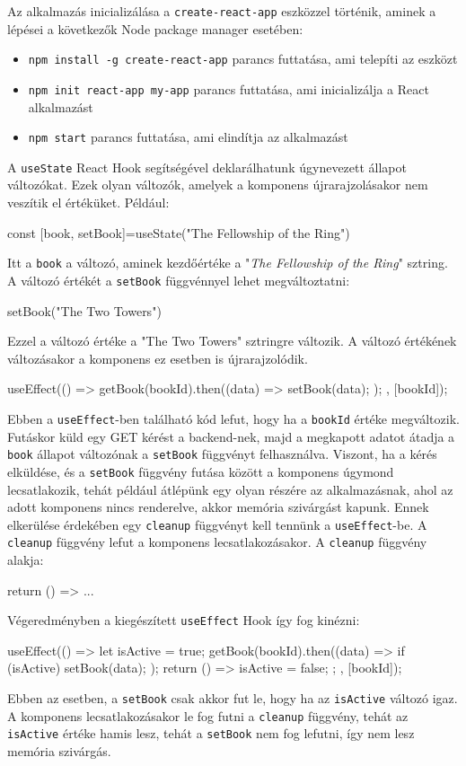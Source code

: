 Az alkalmazás inicializálása a \texttt{create-react-app} eszközzel történik, aminek a lépései a következők Node package manager esetében:
\begin{itemize}
    \item \texttt{npm install -g create-react-app} parancs futtatása, ami telepíti az eszközt
    \item \texttt{npm init react-app my-app} parancs futtatása, ami inicializálja a React alkalmazást
    \item \texttt{npm start} parancs futtatása, ami elindítja az alkalmazást
\end{itemize}

A \texttt{useState} React Hook segítségével deklarálhatunk úgynevezett állapot változókat. Ezek olyan változók, amelyek a komponens újrarajzolásakor nem veszítik el értéküket. Például:
\begin{java}
const [book, setBook]=useState("The Fellowship of the Ring")
\end{java}
Itt a \texttt{book} a változó, aminek kezdőértéke a "\textit{The Fellowship of the Ring}" sztring. A változó értékét a \texttt{setBook} függvénnyel lehet megváltoztatni:
\begin{java}
setBook("The Two Towers")
\end{java}
Ezzel a változó értéke a "The Two Towers" sztringre változik. A változó értékének változásakor a komponens ez esetben is újrarajzolódik.

\begin{java}
useEffect(() => {
  getBook(bookId).then((data) => {
    setBook(data);
  });
}, [bookId]);
\end{java}
Ebben a \texttt{useEffect}-ben található kód lefut, hogy ha a \texttt{bookId} értéke megváltozik. Futáskor küld egy GET kérést a backend-nek, majd a megkapott adatot átadja a \texttt{book} állapot változónak a \texttt{setBook} függvényt felhasználva. Viszont, ha a kérés elküldése, és a \texttt{setBook} függvény futása között a komponens úgymond lecsatlakozik, tehát például átlépünk egy olyan részére az alkalmazásnak, ahol az adott komponens nincs renderelve, akkor memória szivárgást kapunk. Ennek elkerülése érdekében egy \texttt{cleanup} függvényt kell tennünk a \texttt{useEffect}-be. A \texttt{cleanup} függvény lefut a komponens lecsatlakozásakor. A \texttt{cleanup} függvény alakja:
\begin{java}
return () => {...}
\end{java}
Végeredményben a kiegészített \texttt{useEffect} Hook így fog kinézni:
\begin{java}
useEffect(() => {
  let isActive = true;
  getBook(bookId).then((data) => {
    if (isActive) {
      setBook(data);
    }
  });
  return () => {
    isActive = false;
  };
}, [bookId]);
\end{java}
Ebben az esetben, a \texttt{setBook} csak akkor fut le, hogy ha az \texttt{isActive} változó igaz. A komponens lecsatlakozásakor le fog futni a \texttt{cleanup} függvény, tehát az \texttt{isActive} értéke hamis lesz, tehát a \texttt{setBook} nem fog lefutni, így nem lesz memória szivárgás.

